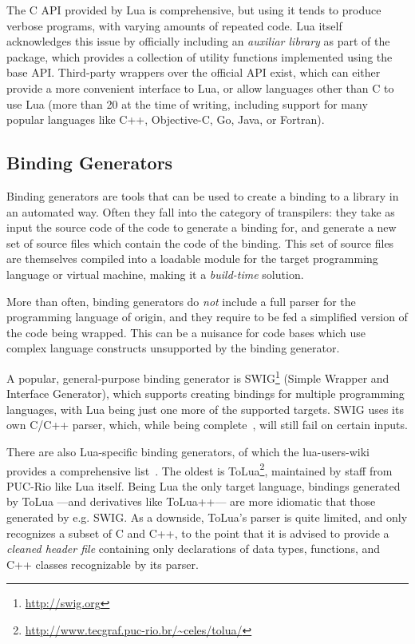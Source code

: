 The C API provided by Lua is comprehensive, but using it tends to produce
verbose programs, with varying amounts of repeated code. Lua itself
acknowledges this issue by officially including an \emph{auxiliar library}
as part of the package, which provides a collection of utility functions
implemented using the base API. Third-party wrappers over the official API
exist, which can either provide a more convenient interface to Lua, or allow
languages other than C to use Lua (more than 20 at the time of writing,
including support for many popular languages like C++, Objective-C, Go,
Java, or Fortran).


\subsection{Binding Generators}

Binding generators are tools that can be used to create a binding to a library
in an automated way. Often they fall into the category of \glspl{transpiler}:
they take as input the source code of the code to generate a binding for,
and generate a new set of source files which contain the code of the binding.
This set of source files are themselves compiled into a loadable module for
the target programming language or virtual machine, making it a
\emph{build-time} solution.

More than often, binding generators do \emph{not} include a full parser for
the programming language of origin, and they require to be fed a simplified
version of the code being wrapped. This can be a nuisance for code bases which
use complex language constructs unsupported by the binding generator.

A popular, general-purpose binding generator is
SWIG\footnote{\url{http://swig.org}} (Simple Wrapper and Interface Generator),
which supports creating bindings for multiple programming languages, with Lua
being just one more of the supported targets. SWIG uses its own C/C++ parser,
which, while being complete~\cite{swig3doc}, will still fail on certain
inputs.

There are also Lua-specific binding generators, of which the
\gls{lua-users-wiki} provides a comprehensive
list~\cite{lusers-BindingCodeToLua}. The oldest is
ToLua\footnote{\url{http://www.tecgraf.puc-rio.br/~celes/tolua/}}, maintained
by staff from \gls{PUC-Rio} like Lua itself. Being Lua the only target
language, bindings generated by ToLua —and derivatives like ToLua++— are more
idiomatic that those generated by e.g. SWIG. As a downside, ToLua's parser is
quite limited, and only recognizes a subset of C and C++, to the point that it
is advised to provide a \emph{cleaned header file} containing only
declarations of data types, functions, and C++ classes recognizable by its
parser.


